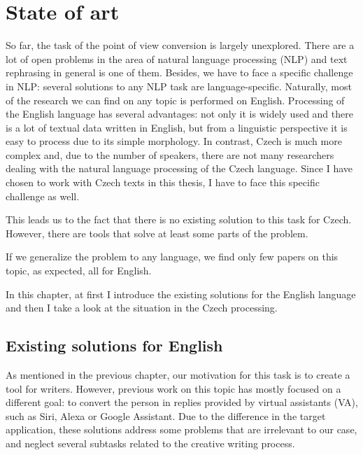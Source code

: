 \section{State of art}

So far, the task of the point of view conversion is largely unexplored. There are a lot of open problems in the area of natural language processing (NLP) and text rephrasing in general is one of them. Besides, we have to face a specific challenge in NLP: several solutions to any NLP task are language-specific. Naturally, most of the research we can find on any topic is performed on English. Processing of the English language has several advantages: not only it is widely used and there is a lot of textual data written in English, but from a linguistic perspective it is easy to process due to its simple morphology. In contrast, Czech is much more complex and, due to the number of speakers, there are not many researchers dealing with the natural language processing of the Czech language. Since I have chosen to work with Czech texts in this thesis, I have to face this specific challenge as well.

This leads us to the fact that there is no existing solution to this task for Czech. However, there are tools that solve at least some parts of the problem.

If we generalize the problem to any language, we find only few papers on this topic, as expected, all for English.

In this chapter, at first I introduce the existing solutions for the English language and then I take a look at the situation in the Czech processing.

\subsection{Existing solutions for English}

As mentioned in the previous chapter, our motivation for this task is to create a tool for writers. However, previous work on this topic has mostly focused on a different goal: to convert the person in replies provided by virtual assistants (VA), such as Siri, Alexa or Google Assistant.  Due to the difference in the target application, these solutions address some problems that are irrelevant to our case, and neglect several subtasks related to the creative writing process.

